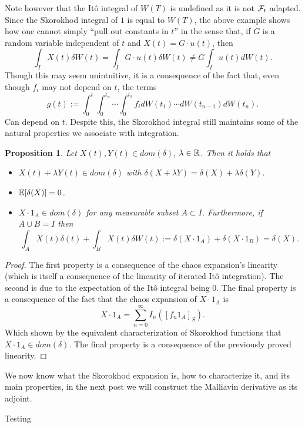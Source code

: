 \documentclass[12pt]{article}
\newtheorem{proposition}{Proposition}
\begin{document}
Note however that the Itô integral of $W(T)$ is undefined as it is not  $\mathcal{F}_t$ adapted. Since the Skorokhod integral of $1$ is equal to  $W(T)$, the above example shows how one cannot simply ``pull out constants in $t$'' in the sense that, if $G$ is a random variable independent of  $t$ and  $X(t)=G\cdot u(t)$, then
\begin{equation*}
	\int_{I} X(t) \delta W(t)=\int_{I}G\cdot u(t)\delta W(t) \neq G\int_{I}u(t) dW(t).
\end{equation*}
Though this may seem unintuitive, it is a consequence of the fact that, even though $f_i$ may not depend on  $t$, the terms
\begin{equation*}
	g(t):=\int_{0}^t\int_{0}^{t_{n}}\cdots \int_{0}^{t_2} f_i dW(t_1)\cdots dW(t_{n-1})dW(t_n).
\end{equation*}
Can depend on $t$. Despite this, the Skorokhod integral still maintains some of the natural properties we associate with integration.
\begin{proposition}
	Let $X(t), Y(t)\in dom(\delta)$, $\lambda \in {\mathbb R}$. Then it holds that
	\begin{itemize}
		\item $X(t)+ \lambda Y(t) \in dom(\delta)$ with $\delta(X+\lambda Y)=\delta(X)+\lambda \delta(Y)$.
		\item $\mathbb{E}[\delta(X)]=0$.
		\item $X\cdot 1_A \in dom(\delta)$ for any measurable subset $A \subset I$. Furthermore, if $A \cup B =I$ then
		      \begin{equation*}
			      \int_{A}X(t) \delta(t)+ \int_{B}X(t)\delta W(t):=\delta(X\cdot 1_A)+\delta(X\cdot 1_B)=\delta(X).
		      \end{equation*}

	\end{itemize}
\end{proposition}

\begin{proof}
	The first property is a consequence of the chaos expansion's linearity (which is itself  a consequence of the linearity of iterated Itô integration). The second is due to the expectation of the Itô integral being $0$. The final property is a consequence of the fact that the chaos expansion of $X\cdot 1_A$ is
	\begin{equation*}
		X\cdot 1_A=\sum_{n=0}^{\infty} I_{n}([f_n 1_A]_S).
	\end{equation*}
	Which shown by the equivalent characterization of Skorokhod functions that $X\cdot 1_A\in dom(\delta)$. The final property is a consequence of the previously proved linearity.
\end{proof}
We now know what the Skorokhod expansion is, how to characterize it, and its main properties, in the next post we will construct the Malliavin derivative as its adjoint.





Testing
\end{document}
